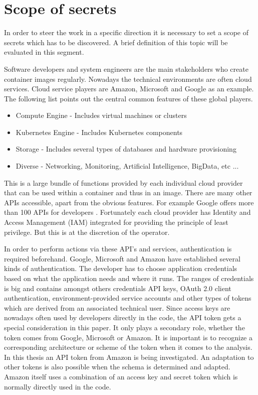 \section{Scope of secrets}
\label{ch:theory:scope_secrets}
In order to steer the work in a specific direction it is necessary to set a scope of secrets which has to be discovered. 
A brief definition of this topic will be evaluated in this segment.

Software developers and system engineers are the main stakeholders who create container images regularly. 
Nowadays the technical environments are often cloud services. 
Cloud service players are Amazon, Microsoft and Google as an example. 
The following list points out the central common features of these global players.
\begin{itemize}
\item Compute Engine - Includes virtual machines or clusters
\item Kubernetes Engine - Includes Kubernetes components
\item Storage - Includes several types of databases and hardware provisioning
\item Diverse - Networking, Monitoring, Artificial Intelligence, BigData, etc ...
\end{itemize}

This is a large bundle of functions provided by each individual cloud provider that can be used within a container and thus in an image.
There are many other APIs accessible, apart from the obvious features. For example Google offers more than 100 APIs for developers \cite{gapi}.
Fortunately each cloud provider has Identity and Access Management (IAM) integrated for providing the principle of least privilege. 
But this is at the discretion of the operator.

In order to perform actions via these API's and services, authentication is required beforehand. 
Google, Microsoft and Amazon have established several kinds of authentication. 
The developer has to choose application credentials based on what the application needs and where it runs.
The ranges of credentials is big and contains amongst others credentials API keys, OAuth 2.0 client authentication, environment-provided service accounts and other types of tokens which are derived from an associated technical user.
Since access keys are nowadays often used by developers directly in the code, the API token gets a special consideration in this paper.
It only plays a secondary role, whether the token comes from Google, Microsoft or Amazon. 
It is important is to recognize a corresponding architecture or scheme of the token when it comes to the analysis.
In this thesis an API token from Amazon is being investigated. An adaptation to other tokens is also possible when the schema is determined and adapted.
Amazon itself uses a combination of an access key and secret token which is normally directly used in the code.

